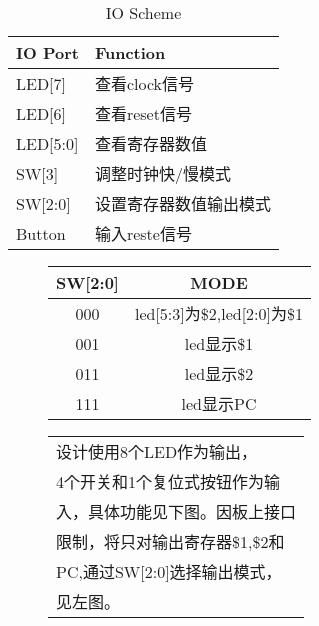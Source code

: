 \documentclass[a4paper]{article}
\begin{document}
    \begin{table}[h]
        \centering
        \begin{tabular}{ll}
              \toprule
              IO Port & Function\\
              \midrule
              LED[7]    &   查看clock信号 \\
              LED[6]    &   查看reset信号 \\
              LED[5:0]  &   查看寄存器数值 \\
              SW[3]     &   调整时钟快/慢模式 \\
              SW[2:0]   &   设置寄存器数值输出模式 \\
              Button    &   输入reste信号 \\
              \bottomrule
            \end{tabular}
            \caption{IO Scheme}
    \end{table}
        \begin{figure}[h]
        \begin{minipage}[t]{0.51\linewidth}
        \centering
        \begin{tabular}{cc}
          \toprule
          SW[2:0] & MODE\\
          \midrule
          000 & led[5:3]为\$2,led[2:0]为\$1 \\
          001 & led显示\$1 \\
          011 & led显示\$2 \\
          111 & led显示PC \\
          \bottomrule
        \end{tabular}
        \end{minipage}%
        \begin{minipage}[t]{0.49\linewidth}
        \centering
        \begin{tabular}{l}
        \qquad    设计使用8个LED作为输出，\\
        4个开关和1个复位式按钮作为输\\
        入，具体功能见下图。因板上接口\\
        限制，将只对输出寄存器\$1,\$2和\\
        PC,通过SW[2:0]选择输出模式，\\
        见左图。\\
        \end{tabular}

        \end{minipage}
    \end{figure}
\end{document}
